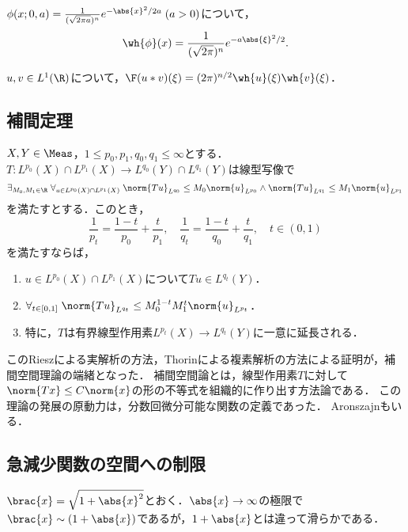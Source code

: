 \documentclass[uplatex, dvipdfmx]{jsreport}
\begin{document}
\begin{theorem}[Gauss関数はFourier変換の固有関数]
    $\phi(x;0,a)=\frac{1}{(\sqrt{2\pi a})^n}e^{-\abs{x}^2/2a}\;(a>0)$について，
    \[\wh{\phi}(x)=\frac{1}{(\sqrt{2\pi})^n}e^{-a\abs{\xi}^2/2}.\]
\end{theorem}

\begin{theorem}
    $u,v\in L^1(\R)$について，$\F(u*v)(\xi)=(2\pi)^{n/2}\wh{u}(\xi)\wh{v}(\xi)$．
\end{theorem}

\subsection{補間定理}

\begin{theorem}
    $X,Y\in\Meas$，$1\le p_0,p_1,q_0,q_1\le\infty$とする．
    $T:L^{p_0}(X)\cap L^{p_1}(X)\to L^{q_0}(Y)\cap L^{q_1}(Y)$は線型写像で\[\exists_{M_0,M_1\in\R}\;\forall_{u\in L^{p_0}(X)\cap L^{p_1}(X)}\;\norm{Tu}_{L^{q_0}}\le M_0\norm{u}_{L^{p_0}}\land\norm{Tu}_{L^{q_1}}\le M_1\norm{u}_{L^{p_1}}\]
    を満たすとする．このとき，
    \[\frac{1}{p_t}=\frac{1-t}{p_0}+\frac{t}{p_1},\quad\frac{1}{q_t}=\frac{1-t}{q_0}+\frac{t}{q_1},\quad t\in(0,1)\]
    を満たすならば，
    \begin{enumerate}
        \item $u\in L^{p_0}(X)\cap L^{p_1}(X)$について$Tu\in L^{q_t}(Y)$．
        \item $\forall_{t\in[0,1]}\;\norm{Tu}_{L^{q_t}}\le M^{1-t}_0M^t_1\norm{u}_{L^{p_t}}$．
        \item 特に，$T$は有界線型作用素$L^{p_t}(X)\to L^{q_t}(Y)$に一意に延長される．
    \end{enumerate}
\end{theorem}
\begin{history}
    このRieszによる実解析の方法，Thorinによる複素解析の方法による証明が，補間空間理論の端緒となった．
    補間空間論とは，線型作用素$T$に対して$\norm{Tx}\le C\norm{x}$の形の不等式を組織的に作り出す方法論である．
    この理論の発展の原動力は，分数回微分可能な関数の定義であった．
    Aronszajnもいる．
\end{history}

\subsection{急減少関数の空間への制限}

\begin{tcolorbox}[colframe=ForestGreen, colback=ForestGreen!10!white,breakable,colbacktitle=ForestGreen!40!white,coltitle=black,fonttitle=\bfseries\sffamily,
title=]
    $\brac{x}=\sqrt{1+\abs{x}^2}$とおく．$\abs{x}\to\infty$の極限で$\brac{x}\sim(1+\abs{x})$であるが，$1+\abs{x}$とは違って滑らかである．
\end{tcolorbox}
\end{document}

